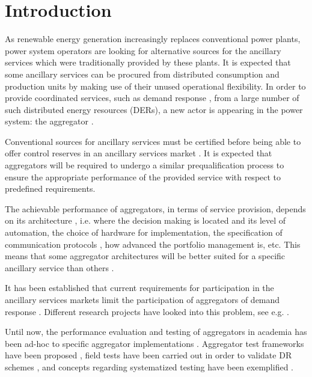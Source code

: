 \section{Introduction}
As renewable energy generation increasingly replaces conventional power plants, power system operators are looking for alternative sources for the ancillary services which were traditionally provided by these plants. It is expected that some ancillary services can be procured from distributed consumption and production units by making use of their unused operational flexibility. In order to provide coordinated services, such as demand response \cite{macdonald2012demand}, from a large number of such distributed energy resources (DERs), a new actor is appearing in the power system: the aggregator \cite{gkatzikis2013a}.%

Conventional sources for ancillary services must be certified before being able to offer control reserves in an ancillary services market \cite{energinet2012ancillary}. It is expected that aggregators will be required to undergo a similar prequalification process to ensure the appropriate performance of the provided service with respect to predefined requirements.

The achievable performance of aggregators, in terms of service provision, depends on its architecture \cite{bondy2015a}, i.e. where the decision making is located \cite{kosek2013overview} and its level of automation, the choice of hardware for implementation, the specification of communication protocols \cite{kiliccote2010open}, how advanced the portfolio management is, etc. This means that some aggregator architectures will be better suited for a specific ancillary service than others \cite{bondy2014performance}. 

It has been established that current requirements for participation in the ancillary services markets limit the participation of aggregators of demand response \cite{cappers2013assessment,coalition2014mapping}. Different research projects have looked into this problem, see e.g. \cite{bondy2014powermax}. 

Until now, the performance evaluation and testing of aggregators in academia has been ad-hoc to specific aggregator implementations \cite{vrettos2015integrating,rahnama2014evaluation}. Aggregator test frameworks have been proposed \cite{buscher2015towards}, field tests have been carried out in order to validate DR schemes \cite{kiliccote2013field}, and concepts regarding systematized testing have been exemplified \cite{steinbrink2015challenges}.

